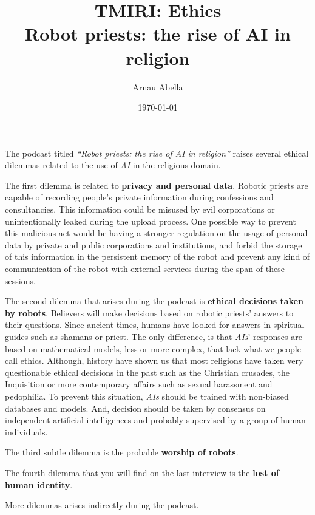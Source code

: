 \documentclass[12pt, a4paper]{article}
\title{%
  \vspace{-10ex}
  TMIRI: Ethics\\
  \Large{Robot priests: the rise of AI in religion}
}
\author{Arnau Abella}
\date{\today}
\begin{document}
\maketitle

\vspace{5ex}

The podcast titled \textit{``Robot priests: the rise of AI in religion''} raises several ethical dilemmas related to the use of \textit{AI} in the religious domain.

The first dilemma is related to \textbf{privacy and personal data}. Robotic priests are capable of recording people's private information during confessions and consultancies. This information could be misused by evil corporations or unintentionally leaked during the upload process. One possible way to prevent this malicious act would be having a stronger regulation on the usage of personal data by private and public corporations and institutions, and forbid the storage of this information in the persistent memory of the robot and prevent any kind of communication of the robot with external services during the span of these sessions.

The second dilemma that arises during the podcast is \textbf{ethical decisions taken by robots}. Believers will make decisions based on robotic priests' answers to their questions.
Since ancient times, humans have looked for answers in spiritual guides such as shamans or priest. The only difference, is that \textit{AIs}' responses are based on mathematical models, less or more complex, that lack what we people call ethics. Although, history have shown us that most religions have taken very questionable ethical decisions in the past such as the Christian crusades, the Inquisition or more contemporary affairs such as sexual harassment and pedophilia. To prevent this situation, \textit{AIs} should be trained with non-biased databases and models. And, decision should be taken by consensus on independent artificial intelligences and probably supervised by a group of human individuals.

The third subtle dilemma is the probable \textbf{worship of robots}.



The fourth dilemma that you will find on the last interview is the \textbf{lost of human identity}.


More dilemmas arises indirectly during the podcast.
\end{document}
